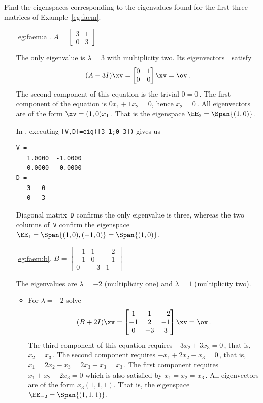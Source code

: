 \begin{example} \label{eg:faespm}
Find the eigenspaces corresponding to the eigenvalues found for the first three matrices of Example~\ref{eg:faem}.
\begin{itemize}
\item[\ref{eg:faem:a}.]
\(A=\begin{bmatrix} 3&1\\0&3 \end{bmatrix}\)
\begin{solution} 
The only eigenvalue is \(\lambda=3\) with multiplicity two.
Its eigenvectors~\xv\ satisfy
\begin{equation*}
(A-3 I)\xv=\begin{bmatrix} 0&1\\0&0 \end{bmatrix}\xv=\ov\,.
\end{equation*}
The second component of this equation is the trivial \(0=0\)\,.  The first component of the equation is \(0x_1+1x_2=0\), hence \(x_2=0\)\,.
All eigenvectors are of the form \(\xv=(1,0)x_1\)\,.  
That is the eigenspace  \(\EE_3=\Span\{(1,0)\}\).

In \script, executing \verb|[V,D]=eig([3 1;0 3])| gives us
\begin{verbatim}
V =
   1.0000  -1.0000
   0.0000   0.0000
D =
   3   0
   0   3
\end{verbatim}
Diagonal matrix~\verb|D| confirms the only eigenvalue is three, whereas the two columns of~\verb|V| confirm the eigenspace \(\EE_1=\Span\{(1,0),(-1,0)\}=\Span\{(1,0)\}\).
\end{solution}


\item[\ref{eg:faem:b}.]
\(B=\begin{bmatrix}-1&1&-2
\\-1&0&-1
\\0&-3&1 \end{bmatrix}\)
\begin{solution} 
The eigenvalues are \(\lambda=-2\) (multiplicity one) and \(\lambda=1\) (multiplicity two).
\begin{itemize}
\item For \(\lambda=-2\) solve
\begin{equation*}
(B+2I)\xv=\begin{bmatrix}1&1&-2
\\-1&2&-1
\\0&-3&3 \end{bmatrix}\xv=\ov\,.
\end{equation*}
The third component of this equation requires \(-3x_2+3x_3=0\)\,, that is, \(x_2=x_3\)\,.
The second component requires \(-x_1+2x_2-x_3=0\)\,, that is, \(x_1=2x_2-x_3=2x_3-x_3=x_3\)\,.
The first component requires \(x_1+x_2-2x_3=0\) which is also satisfied by \(x_1=x_2=x_3\)\,.
All eigenvectors are of the form \(x_3(1,1,1)\).
That is, the eigenspace \(\EE_{-2}=\Span\{(1,1,1)\}\).


\end{itemize}
\end{solution}
\end{itemize}
\end{example}
